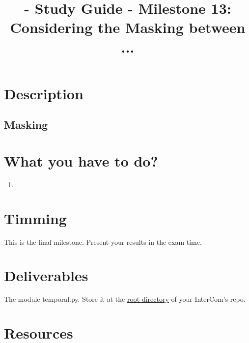 
\title{\TM{} - Study Guide - Milestone 13: Considering the Masking between ...}

\maketitle

\section{Description}

\subsection{Masking}


  
\section{What you have to do?}

\begin{enumerate}
\item
\end{enumerate}

\section{Timming}

This is the final milestone. Present your results in the exam time.

\section{Deliverables}

The module temporal.py. Store it at the
\href{https://github.com/Tecnologias-multimedia/intercom}{root
  directory} of your InterCom's repo.

\section{Resources}




